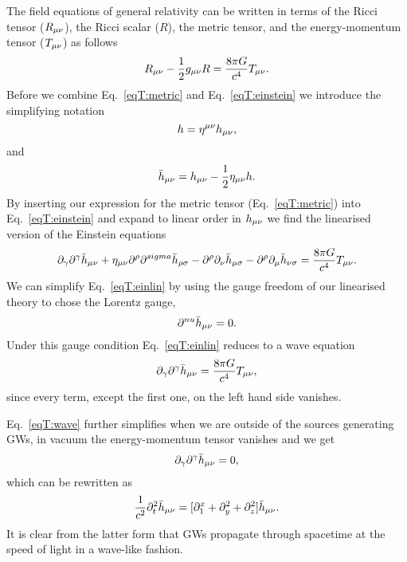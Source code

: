 The field equations of general relativity can
be written in terms of the Ricci tensor ($R_{\mu\nu}$), the Ricci scalar ($R$), the metric tensor,
and the energy-momentum tensor ($T_{\mu\nu}$) as follows
\begin{equation} \label{eqT:einstein}
R_{\mu\nu} - \frac{1}{2} g_{\mu\nu} R = \frac{8 \pi G}{c^4 } T_{\mu\nu}. 
\end{equation}
Before we combine Eq.~\ref{eqT:metric} and Eq.~\ref{eqT:einstein} we introduce the simplifying notation
\begin{equation} \label{eqT:h}
h = \eta^{\mu\nu}h_{\mu\nu},
\end{equation}
and
\begin{equation} \label{eqT:hbar}
\bar{h}_{\mu\nu} = h_{\mu\nu} - \frac{1}{2}\eta_{\mu\nu}h.
\end{equation}
By inserting our expression for the metric tensor (Eq.~\ref{eqT:metric}) into Eq.~\ref{eqT:einstein}
and expand to linear order in $h_{\mu\nu}$ we find the linearised version of the Einstein equations
\begin{equation} \label{eqT:einlin}
\partial_{\gamma} \partial^{\gamma} \bar{h}_{\mu\nu} + \eta_{\mu\nu} \partial^{\rho} \partial^{sigma} \bar{h}_{\rho \sigma}
- \partial^{\rho}\partial_{\nu}\bar{h}_{\mu \sigma} -  \partial^{\rho}\partial_{\mu}\bar{h}_{\nu \sigma}
= \frac{8 \pi G}{c^4 } T_{\mu\nu}.
\end{equation}
We can simplify Eq.~\ref{eqT:einlin} by using the gauge freedom of our linearised theory to chose the Lorentz gauge,
\begin{equation} \label{eqT:lor}
\partial^{nu} \bar{h}_{\mu\nu} = 0.
\end{equation}
Under this gauge condition Eq.~\ref{eqT:einlin} reduces to a wave equation 
\begin{equation} \label{eqT:wave}
\partial_{\gamma} \partial^{\gamma} \bar{h}_{\mu\nu} = \frac{8 \pi G}{c^4 } T_{\mu\nu},
\end{equation}
since every term, except the first one, on the left hand side vanishes. 

Eq.~\ref{eqT:wave} further simplifies when we are outside of the sources generating
GWs, in vacuum the energy-momentum tensor vanishes and we get  
\begin{equation} \label{eqT:wavevacuum}
\partial_{\gamma} \partial^{\gamma} \bar{h}_{\mu\nu} = 0,
\end{equation}
which can be rewritten as
\begin{equation} \label{eqT:wavevacumm2}
\frac{1}{c^2} \partial_t^2 \bar{h}_{\mu\nu} = [ \partial_1^x  + \partial_y^2 + \partial_z^2] \bar{h}_{\mu\nu}.
\end{equation}
It is clear from the latter form that GWs propagate through spacetime at the speed of light in a wave-like fashion.

